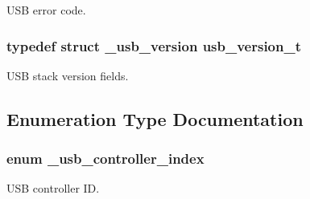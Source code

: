 U\-S\-B error code. 

\hypertarget{group__usb__drv_ga05687927bd26979d4ccb85a4aa049d5a}{
\subsubsection[{usb\-\_\-version\-\_\-t}]{\setlength{\rightskip}{0pt plus 5cm}typedef struct {\bf \-\_\-usb\-\_\-version}  {\bf usb\-\_\-version\-\_\-t}}}\label{group__usb__drv_ga05687927bd26979d4ccb85a4aa049d5a}


U\-S\-B stack version fields. 



\subsection{Enumeration Type Documentation}
\hypertarget{group__usb__drv_gabbaaa0009bbf8797e30a739960f3fd58}{
\subsubsection[{\-\_\-usb\-\_\-controller\-\_\-index}]{\setlength{\rightskip}{0pt plus 5cm}enum {\bf \-\_\-usb\-\_\-controller\-\_\-index}}}\label{group__usb__drv_gabbaaa0009bbf8797e30a739960f3fd58}


U\-S\-B controller I\-D. 

